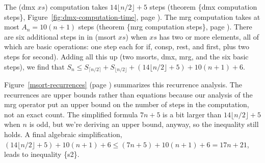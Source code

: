 The \textsf{(dmx $xs$)} computation takes $14\lfloor  n/2\rfloor + 5$ steps
(theorem \{dmx computation steps\},
Figure~\ref{fig:dmx-computation-time},
page \pageref{fig:dmx-computation-time}).
The \textsf{mrg} computation takes at most $A_n = 10(n+1)$ steps
(theorem \{mrg computation steps\}, page \pageref{thm:mrg-steps}).
There are six additional steps in
in \textsf{(msort $xs$)} when $xs$ has two or more elements,
all of which are basic operations:
one step each for \textsf{if}, \textsf{consp}, \textsf{rest}, and \textsf{first},
plus two steps for \textsf{second}).
Adding all this up
(two \textsf{msorts}, \textsf{dmx}, \textsf{mrg}, and the six basic steps),
we find that
$S_n \leq S_{\lceil  n/2\rceil} + S_{\lfloor  n/2\rfloor} +
          (14\lfloor n/2\rfloor + 5) + 10(n+1) + 6$.

Figure~\ref{msort-recurrences} (page \pageref{msort-recurrences})
summarizes this recurrence analysis.
The recurrences are upper bounds rather than equations because
our analysis of the \textsf{mrg} operator put an upper bound on
the number of steps in the computation, not an exact count.
The simplified formula $7n + 5$
is a bit larger than $14\lfloor n/2\rfloor + 5$
when $n$ is odd, but we're deriving an upper bound,
anyway, so the inequality still holds.
A final algebraic simplification,
$(14\lfloor n/2\rfloor + 5) + 10(n+1) + 6 \leq (7n + 5) + 10(n+1) + 6 = 17n + 21$,
leads to inequality \{s2\}.

